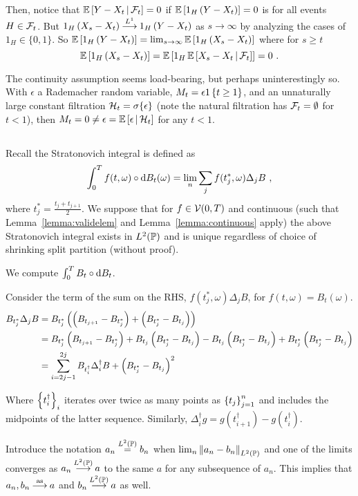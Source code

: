 \documentclass{article}
\begin{document}
Then, notice that \(\CE{Y-X_t}{\mcF_t}=0\) if \(\E\ha{1_H\pa{Y-X_t}}=0\) is for all events \(H\in \mcF_t\).
But \(1_H\pa{X_s-X_t}\convarg{L^1}1_H\pa{Y-X_t}\) as \(s\rightarrow\infty\) by analyzing the cases of \(1_H\in\{0,1\}\). So \(\E\ha{1_H\pa{Y-X_t}}=\lim_{s\rightarrow\infty}\E\ha{1_H\pa{X_s-X_t}}\) where for \(s\ge t\)
\[
  \E\ha{1_H\pa{X_s-X_t}}=\E \ha{1_H\CE{X_s-X_t}{\mcF_t}}=0\,\,.
\]

The continuity assumption seems load-bearing, but perhaps uninterestingly so. With \(\epsilon\) a Rademacher random variable, \(M_t=\epsilon 1\ca{t\ge 1}\), and an unnaturally large constant filtration \(\mcH_t=\sigma\{\epsilon\}\) (note the natural filtration has \(\mcF_t=\emptyset\) for \(t<1\)), then \(M_t=0\neq \epsilon=\CE{\epsilon}{\mcH_{t}}\) for any \(t<1\).

\subsection{}\label{ex3.9}

Recall the Stratonovich integral is defined as
\[
  \int_0^Tf(t,\omega)\circ\d{B_t(\omega)}=\lim_n\sum_jf(t_j^*,\omega)\Delta_jB\,\,,
\]
where \(t_j^*=\frac{t_j+t_{j+1}}{2}\). We suppose that for \(f\in\mcV(0, T)\) and continuous (such that Lemma~\ref{lemma:validelem} and Lemma~\ref{lemma:continuous} apply) the above Stratonovich integral exists in \(L^2(\P)\) and is unique regardless of choice of shrinking split partition (without proof).

We compute \(\int_0^TB_t\circ\d{B_t}\).

Consider the term of the sum on the RHS, \(f(t_j^*,\omega)\Delta_jB\), for \(f(t,\omega)=B_t(\omega)\).
\begin{align*}
  B_{t_j^*}\Delta_jB
  &=B_{t_j^*}\pa{\pa{B_{t_{j+1}}-B_{t_j^*}}+\pa{B_{t_j^*}-B_{t_j}}}\\
  &=B_{t_j^*}\pa{B_{t_{j+1}}-B_{t_j^*}}+B_{t_j}\pa{B_{t_{j}^*}-B_{t_j}}
    -B_{t_j}\pa{B_{t_{j}^*}-B_{t_j}}+B_{t_j^*}\pa{B_{t_j^*}-B_{t_j}}\\
  &=\sum_{i=2j-1}^{2j}B_{t_i^\dag}\Delta_i^\dag B+\pa{B_{t_j^*}-B_{t_j}}^2
\end{align*}

Where \(\ca{t_i^\dag}_i\) iterates over twice as many points as \(\ca{t_j}_{j=1}^n\) and includes the midpoints of the latter sequence. Similarly, \(\Delta_i^\dag g=g(t_{i+1}^\dag)-g(t_{i}^\dag)\).

Introduce the notation \(a_n\lpeq b_n\) when \(\lim_n\norm{a_n-b_n}_{L^2(\P)}\) and one of the limits converges as \(a_n\convlp a\) to the same \(a\) for any subsequence of \(a_n\). This implies that \(a_n,b_n\convas a\) and \(b_n\convlp a\) as well.
\end{document}

